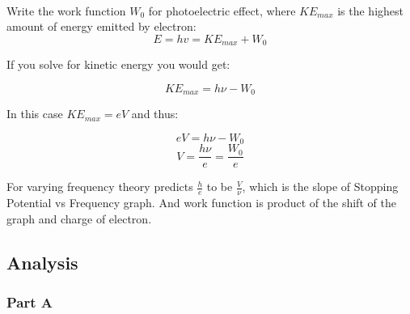 \documentclass{article}
\begin{document}
\paragraph{}

Write the work function $W_0$ for photoelectric effect, where $KE_{max}$ is the highest amount of energy emitted by electron:
\begin{equation}
    E=hv=KE_{max}+W_0
\end{equation}

If you solve for kinetic energy you would get:

\begin{equation}
    KE_{max}=h\nu-W_0
\end{equation}

In this case $KE_{max}=eV$ and thus:

\begin{equation}
    eV=h\nu-W_0
\end{equation}
\begin{equation}
    V=\frac{h\nu}{e}=\frac{W_0}{e}
\end{equation}

For varying frequency theory predicts $\frac{h}{e}$ to be $\frac{V}{\nu}$, which is the slope of Stopping Potential vs Frequency graph. And work function is product of the shift of the graph and charge of electron.

\paragraph{}


\newpage

\subsection{Analysis}

\paragraph{}

\subsubsection{Part A}
\end{document}
